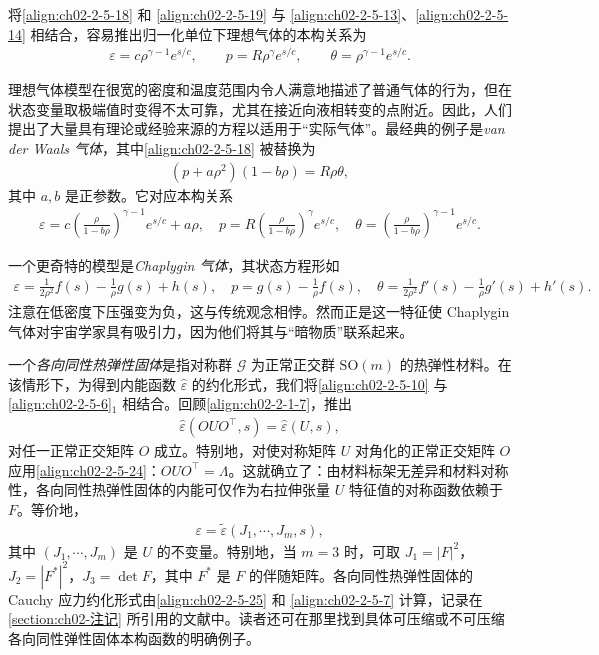 \documentclass[../../main.tex]{subfiles}
\begin{document}
将\eqref{align:ch02-2-5-18} 和 \eqref{align:ch02-2-5-19} 与 \eqref{align:ch02-2-5-13}、\eqref{align:ch02-2-5-14} 相结合，容易推出归一化单位下理想气体的本构关系为
\begin{align}
\varepsilon=c\rho^{\gamma-1}e^{s/c},\qquad p=R\rho^{\gamma}e^{s/c},\qquad\theta=\rho^{\gamma-1}e^{s/c}.
\label{align:ch02-2-5-20}
\end{align}

理想气体模型在很宽的密度和温度范围内令人满意地描述了普通气体的行为，但在状态变量取极端值时变得不太可靠，尤其在接近向液相转变的点附近。因此，人们提出了大量具有理论或经验来源的方程以适用于“实际气体”。最经典的例子是\emph{van der Waals 气体}，其中\eqref{align:ch02-2-5-18} 被替换为
\begin{align}
(p+a\rho^{2})(1-b\rho)=R\rho\theta,
\label{align:ch02-2-5-21}
\end{align}
其中 $a,b$ 是正参数。它对应本构关系
\begin{align}
\varepsilon=c\left(\frac{\rho}{1-b\rho}\right)^{\gamma-1}e^{s/c}+a\rho,\quad
p=R\left(\frac{\rho}{1-b\rho}\right)^{\gamma}e^{s/c},\quad
\theta=\left(\frac{\rho}{1-b\rho}\right)^{\gamma-1}e^{s/c}.
\label{align:ch02-2-5-22}
\end{align}

一个更奇特的模型是\emph{Chaplygin 气体}，其状态方程形如
\begin{align}
\varepsilon=\frac{1}{2\rho^{2}}f(s)-\frac{1}{\rho}g(s)+h(s),\quad
p=g(s)-\frac{1}{\rho}f(s),\quad
\theta=\frac{1}{2\rho^{2}}f'(s)-\frac{1}{\rho}g'(s)+h'(s).
\label{align:ch02-2-5-23}
\end{align}
注意在低密度下压强变为负，这与传统观念相悖。然而正是这一特征使 Chaplygin 气体对宇宙学家具有吸引力，因为他们将其与“暗物质”联系起来。

一个\emph{各向同性热弹性固体}是指对称群 $\mathscr{G}$ 为正常正交群 $\mathrm{SO}(m)$ 的热弹性材料。在该情形下，为得到内能函数 $\hat{\varepsilon}$ 的约化形式，我们将\eqref{align:ch02-2-5-10} 与 \eqref{align:ch02-2-5-6}$_{1}$ 相结合。回顾\eqref{align:ch02-2-1-7}，推出
\begin{align}
\hat{\varepsilon}(OUO^{\top},s)=\hat{\varepsilon}(U,s),
\label{align:ch02-2-5-24}
\end{align}
对任一正常正交矩阵 $O$ 成立。特别地，对使对称矩阵 $U$ 对角化的正常正交矩阵 $O$ 应用\eqref{align:ch02-2-5-24}：$OUO^{\top}=\Lambda$。这就确立了：由材料标架无差异和材料对称性，各向同性热弹性固体的内能可仅作为右拉伸张量 $U$ 特征值的对称函数依赖于 $F$。等价地，
\begin{align}
\varepsilon=\tilde{\varepsilon}(J_{1},\cdots,J_{m},s),
\label{align:ch02-2-5-25}
\end{align}
其中 $(J_{1},\cdots,J_{m})$ 是 $U$ 的不变量。特别地，当 $m=3$ 时，可取 $J_{1}=|F|^{2}$，$J_{2}=|F^{*}|^{2}$，$J_{3}=\det F$，其中 $F^{*}$ 是 $F$ 的伴随矩阵。各向同性热弹性固体的 Cauchy 应力约化形式由\eqref{align:ch02-2-5-25} 和 \eqref{align:ch02-2-5-7} 计算，记录在\cref{section:ch02-注记} 所引用的文献中。读者还可在那里找到具体可压缩或不可压缩各向同性弹性固体本构函数的明确例子。
\end{document}
